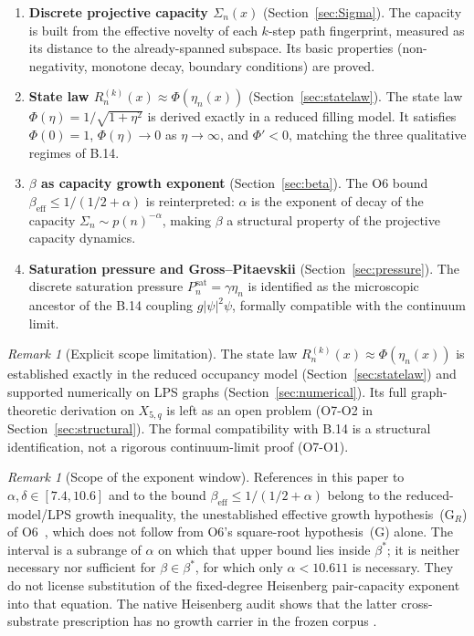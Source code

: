 \documentclass[11pt,a4paper]{article}
\theoremstyle{definition}
\theoremstyle{remark}
\newtheorem{remark}[theorem]{Remark}
\newcommand{\beff}{\beta_{\mathrm{eff}}}
\begin{document}
  \begin{enumerate}
    \item \textbf{Discrete projective capacity $\Sigma_n(x)$} (Section~\ref{sec:Sigma}).
    The capacity is built from the effective novelty of each $k$-step path fingerprint,
    measured as its distance to the already-spanned subspace.
    Its basic properties (non-negativity, monotone decay, boundary conditions) are proved.

    \item \textbf{State law $R_n^{(k)}(x) \approx \Phi(\eta_n(x))$} (Section~\ref{sec:statelaw}).
    The state law $\Phi(\eta) = 1/\sqrt{1+\eta^2}$ is derived exactly in a reduced filling model.
    It satisfies $\Phi(0)=1$, $\Phi(\eta)\to 0$ as $\eta\to\infty$, and $\Phi'<0$,
    matching the three qualitative regimes of B.14.

    \item \textbf{$\beta$ as capacity growth exponent} (Section~\ref{sec:beta}).
    The O6 bound $\beff \leq 1/(1/2+\alpha)$ is reinterpreted: $\alpha$ is the exponent of
    decay of the capacity $\Sigma_n \sim p(n)^{-\alpha}$, making $\beta$ a structural property
    of the projective capacity dynamics.

    \item \textbf{Saturation pressure and Gross--Pitaevskii} (Section~\ref{sec:pressure}).
    The discrete saturation pressure $P_n^{\mathrm{sat}} = \gamma\eta_n$ is identified as the
    microscopic ancestor of the B.14 coupling $g|\psi|^2\psi$, formally compatible with the
    continuum limit.
  \end{enumerate}

  \begin{remark}[Explicit scope limitation]
    \label{rem:scope}
    The state law $R_n^{(k)}(x) \approx \Phi(\eta_n(x))$ is established exactly in the reduced
    occupancy model (Section~\ref{sec:statelaw}) and supported numerically on LPS graphs
    (Section~\ref{sec:numerical}).
    Its full graph-theoretic derivation on $X_{5,q}$ is left as an open problem (O7-O2 in
    Section~\ref{sec:structural}).
    The formal compatibility with B.14 is a structural identification, not a rigorous
    continuum-limit proof (O7-O1).
  \end{remark}

  \begin{remark}[Scope of the exponent window]
    References in this paper to $\alpha,\delta \in [7.4,10.6]$ and to the bound
    $\beff \leq 1/(1/2+\alpha)$ belong to the reduced-model/LPS growth inequality, the unestablished
    effective growth hypothesis~(G$_R$) of O6~\cite{Beau2026a10}, which does not follow from O6's
    square-root hypothesis~(G) alone.
    The interval is a subrange of $\alpha$ on which that upper bound lies inside $\beta^*$; it is neither
    necessary nor sufficient for $\beta \in \beta^*$, for which only $\alpha < 10.611$ is necessary.
    They do not license substitution of the fixed-degree Heisenberg pair-capacity
    exponent into that equation.  The native Heisenberg audit shows that the latter
    cross-substrate prescription has no growth carrier in the frozen corpus
    \cite{Beau2026sgn}.
  \end{remark}
\end{document}
